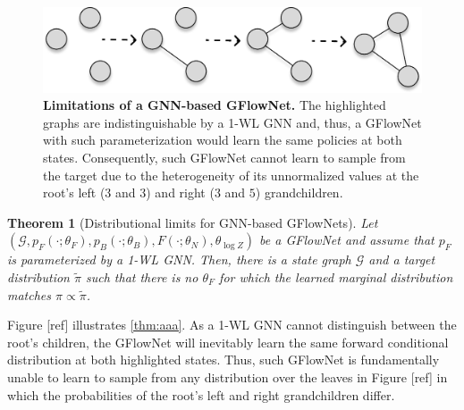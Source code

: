 \documentclass{article}
\theoremstyle{plain}
\newtheorem{theorem}{Theorem}[section]
\theoremstyle{definition}
\theoremstyle{remark}
\theoremstyle{remark}
\begin{document}
\begin{figure}[!t] 
    \centering
    \includegraphics[page=3, width=\linewidth]{graphsss.pdf}
    \caption{\textbf{Limitations of a GNN-based GFlowNet.} The highlighted graphs are indistinguishable by a 1-WL GNN and, thus, a GFlowNet with such parameterization would learn the same policies at both states. Consequently, such GFlowNet cannot learn to sample from the target due to the heterogeneity of its unnormalized values at the root's left ($3$ and $3$) and right ($3$ and $5$) grandchildren.}
    \label{fig:gnns_state}
\end{figure}

\begin{theorem}[Distributional limits for GNN-based GFlowNets] 
\label{thm:aaa} 
    Let $(\mathcal{G}, p_{F}(\cdot ; \theta_{F}), p_{B}(\cdot ; \theta_{B}), F(\cdot ; \theta_{N}), \theta_{\log Z})$ be a GFlowNet and assume that $p_{F}$ is parameterized by a 1-WL GNN. Then, there is a state graph $\mathcal{G}$ and a target distribution $\tilde{\pi}$ such that there is no $\theta_{F}$ for which the learned marginal distribution matches $\pi \propto \tilde{\pi}$.   
\end{theorem}

Figure [ref] illustrates \autoref{thm:aaa}. As a 1-WL GNN cannot distinguish between the root's children, the GFlowNet will inevitably learn the same forward conditional distribution at both highlighted states. Thus, such GFlowNet is fundamentally unable to learn to sample from any distribution over the leaves in Figure [ref] in which the probabilities of the root's left and right grandchildren differ. 
\end{document}
